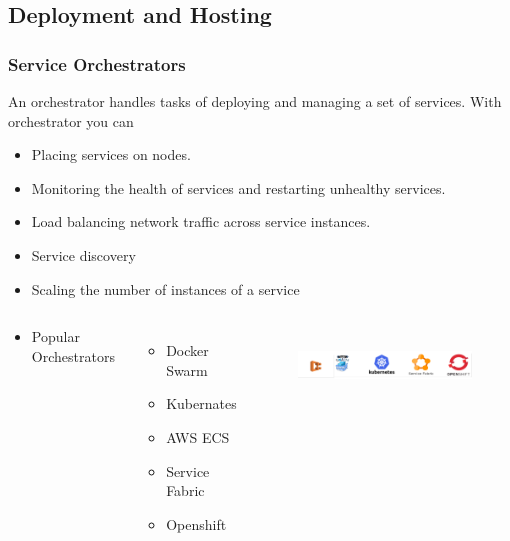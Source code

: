 \documentclass{beamer}
\begin{document}
	\subsection {Deployment and Hosting}
		\begin{frame}
			\frametitle{Service Orchestrators}
				An orchestrator handles tasks of deploying and managing a set of services. With orchestrator you can 
				\begin{itemize}
					\item<1-> Placing services on nodes. 
					\item<2-> Monitoring the health of services and restarting unhealthy services.
					\item<3-> Load balancing network traffic across service instances. 
					\item<4-> Service discovery
					\item<5-> Scaling the number of instances of a service
					\item<6->[]
						\vspace{5mm}
						\begin{columns}[c]
							Popular Orchestrators
							\begin{itemize}
								\item Docker Swarm
								\item Kubernates
								\item AWS ECS
								\item Service Fabric
								\item Openshift
							\end{itemize}
							
							\begin{figure}[h]
								\includegraphics[width=70mm, height=20mm, scale=1]{img/service-orch.png}
							\end{figure}\vspace{1mm}
						\end{columns}
				\end{itemize}
			\vspace{100mm}
		\end{frame}
	
\end{document}
